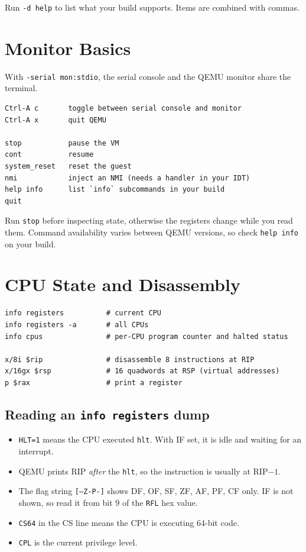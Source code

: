 \documentclass[11pt,a4paper]{article}
\newcommand{\cmd}[1]{\texttt{#1}}
\begin{document}
Run \cmd{-d help} to list what your build supports. Items are combined with commas.
\section{Monitor Basics}

With \cmd{-serial mon:stdio}, the serial console and the QEMU monitor share the
terminal.

\begin{lstlisting}
Ctrl-A c       toggle between serial console and monitor
Ctrl-A x       quit QEMU

stop           pause the VM
cont           resume
system_reset   reset the guest
nmi            inject an NMI (needs a handler in your IDT)
help info      list `info` subcommands in your build
quit
\end{lstlisting}

Run \cmd{stop} before inspecting state, otherwise the registers change while you
read them. Command availability varies between QEMU versions, so check
\cmd{help info} on your build.

\section{CPU State and Disassembly}

\begin{lstlisting}
info registers          # current CPU
info registers -a       # all CPUs
info cpus               # per-CPU program counter and halted status

x/8i $rip               # disassemble 8 instructions at RIP
x/16gx $rsp             # 16 quadwords at RSP (virtual addresses)
p $rax                  # print a register
\end{lstlisting}

\subsection*{Reading an \texttt{info registers} dump}

\begin{itemize}
  \item \cmd{HLT=1} means the CPU executed \cmd{hlt}. With IF set, it is idle and
        waiting for an interrupt.
  \item QEMU prints RIP \emph{after} the \cmd{hlt}, so the instruction is
        usually at RIP$-1$.
  \item The flag string \cmd{[---Z-P-]} shows DF, OF, SF, ZF, AF, PF, CF only.
        IF is not shown, so read it from bit 9 of the \cmd{RFL} hex value.
  \item \cmd{CS64} in the CS line means the CPU is executing 64-bit code.
  \item \cmd{CPL} is the current privilege level.
\end{itemize}
\end{document}
